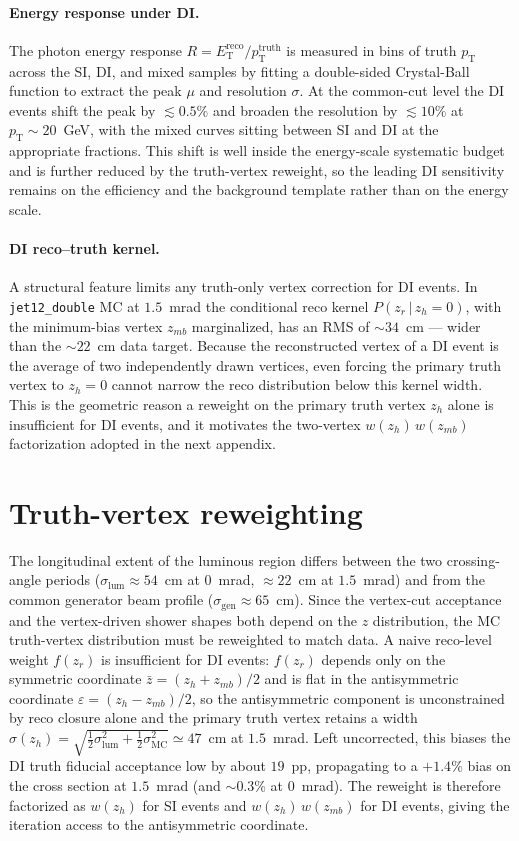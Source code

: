 \documentclass[11pt]{article}
\newcommand{\pt}{p_{\mathrm{T}}}
\begin{document}
\paragraph{Energy response under DI.} The photon energy response
$R=E_{\mathrm{T}}^{\mathrm{reco}}/p_{\mathrm{T}}^{\mathrm{truth}}$ is measured in
bins of truth $\pt$ across the SI, DI, and mixed samples by fitting a
double-sided Crystal-Ball function to extract the peak $\mu$ and resolution
$\sigma$. At the common-cut level the DI events shift the peak by $\lesssim0.5\%$
and broaden the resolution by $\lesssim10\%$ at $\pt\sim20$~GeV, with the mixed
curves sitting between SI and DI at the appropriate fractions. This shift is well
inside the energy-scale systematic budget and is further reduced by the
truth-vertex reweight, so the leading DI sensitivity remains on the efficiency and
the background template rather than on the energy scale.

\paragraph{DI reco--truth kernel.} A structural feature limits any truth-only
vertex correction for DI events. In \texttt{jet12\_double} MC at $1.5$~mrad the
conditional reco kernel $P(z_r\,|\,z_h=0)$, with the minimum-bias vertex $z_{mb}$
marginalized, has an RMS of $\sim34$~cm --- wider than the $\sim22$~cm data target.
Because the reconstructed vertex of a DI event is the average of two
independently drawn vertices, even forcing the primary truth vertex to $z_h=0$
cannot narrow the reco distribution below this kernel width. This is the
geometric reason a reweight on the primary truth vertex $z_h$ alone is
insufficient for DI events, and it motivates the two-vertex
$w(z_h)\,w(z_{mb})$ factorization adopted in the next appendix.

\section{Truth-vertex reweighting}
\label{app:tvr}
The longitudinal extent of the luminous region differs between the two
crossing-angle periods ($\sigma_{\mathrm{lum}}\approx54$~cm at $0$~mrad,
$\approx22$~cm at $1.5$~mrad) and from the common generator beam profile
($\sigma_{\mathrm{gen}}\approx65$~cm). Since the vertex-cut acceptance and the
vertex-driven shower shapes both depend on the $z$ distribution, the MC
truth-vertex distribution must be reweighted to match data. A naive reco-level
weight $f(z_r)$ is insufficient for DI events: $f(z_r)$ depends only on the
symmetric coordinate $\bar z=(z_h+z_{mb})/2$ and is flat in the antisymmetric
coordinate $\varepsilon=(z_h-z_{mb})/2$, so the antisymmetric component is
unconstrained by reco closure alone and the primary truth vertex retains a width
$\sigma(z_h)=\sqrt{\tfrac12\sigma_{\mathrm{lum}}^2+\tfrac12\sigma_{\mathrm{MC}}^2}\simeq47$~cm
at $1.5$~mrad. Left uncorrected, this biases the DI truth fiducial acceptance low
by about $19$~pp, propagating to a $+1.4\%$ bias on the cross section at $1.5$~mrad
(and $\sim0.3\%$ at $0$~mrad). The reweight is therefore factorized as $w(z_h)$ for
SI events and $w(z_h)\,w(z_{mb})$ for DI events, giving the iteration access to the
antisymmetric coordinate.
\end{document}
